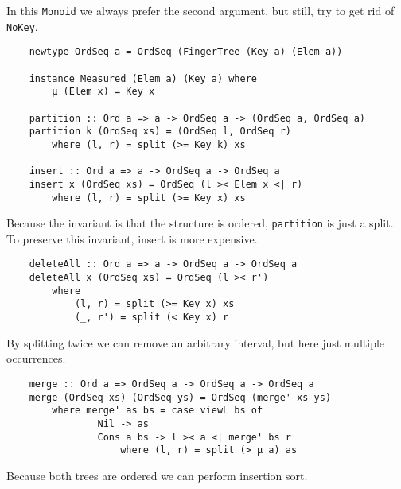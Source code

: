 In this \texttt{Monoid} we always prefer the second argument, but still, try to get rid of \texttt{NoKey}.

\begin{verbatim}
    newtype OrdSeq a = OrdSeq (FingerTree (Key a) (Elem a))

    instance Measured (Elem a) (Key a) where
        μ (Elem x) = Key x
        
    partition :: Ord a => a -> OrdSeq a -> (OrdSeq a, OrdSeq a)
    partition k (OrdSeq xs) = (OrdSeq l, OrdSeq r)
        where (l, r) = split (>= Key k) xs

    insert :: Ord a => a -> OrdSeq a -> OrdSeq a
    insert x (OrdSeq xs) = OrdSeq (l >< Elem x <| r)
        where (l, r) = split (>= Key x) xs
\end{verbatim}

Because the invariant is that the structure is ordered, \texttt{partition} is just a split. To preserve this invariant, insert is more expensive.

\begin{verbatim}
    deleteAll :: Ord a => a -> OrdSeq a -> OrdSeq a
    deleteAll x (OrdSeq xs) = OrdSeq (l >< r')
        where
            (l, r) = split (>= Key x) xs
            (_, r') = split (< Key x) r
\end{verbatim}

By splitting twice we can remove an arbitrary interval, but here just multiple occurrences.

\begin{verbatim}
    merge :: Ord a => OrdSeq a -> OrdSeq a -> OrdSeq a
    merge (OrdSeq xs) (OrdSeq ys) = OrdSeq (merge' xs ys)
        where merge' as bs = case viewL bs of
                Nil -> as
                Cons a bs -> l >< a <| merge' bs r
                    where (l, r) = split (> μ a) as
\end{verbatim}

Because both trees are ordered we can perform insertion sort.